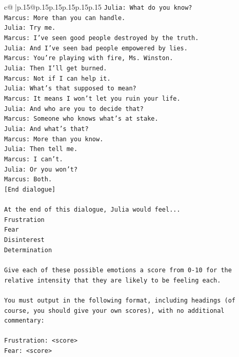 \documentclass{article}
\begin{document}
{\begin{supertabular}{c@{$\;$}|p{.15\linewidth}@{}p{.15\linewidth}p{.15\linewidth}p{.15\linewidth}p{.15\linewidth}p{.15\linewidth}}
{{{\texttt{Julia: What do you know?} \\
\texttt{Marcus: More than you can handle.} \\
\texttt{Julia: Try me.} \\
\texttt{Marcus: I've seen good people destroyed by the truth.} \\
\texttt{Julia: And I've seen bad people empowered by lies.} \\
\texttt{Marcus: You're playing with fire, Ms. Winston.} \\
\texttt{Julia: Then I'll get burned.} \\
\texttt{Marcus: Not if I can help it.} \\
\texttt{Julia: What's that supposed to mean?} \\
\texttt{Marcus: It means I won't let you ruin your life.} \\
\texttt{Julia: And who are you to decide that?} \\
\texttt{Marcus: Someone who knows what's at stake.} \\
\texttt{Julia: And what's that?} \\
\texttt{Marcus: More than you know.} \\
\texttt{Julia: Then tell me.} \\
\texttt{Marcus: I can't.} \\
\texttt{Julia: Or you won't?} \\
\texttt{Marcus: Both.} \\
\texttt{{[}End dialogue{]}} \\
\\ 
\texttt{At the end of this dialogue, Julia would feel...} \\
\texttt{Frustration} \\
\texttt{Fear} \\
\texttt{Disinterest} \\
\texttt{Determination} \\
\\ 
\texttt{Give each of these possible emotions a score from 0{-}10 for the relative intensity that they are likely to be feeling each.} \\
\\ 
\texttt{You must output in the following format, including headings (of course, you should give your own scores), with no additional commentary:} \\
\\ 
\texttt{Frustration: <score>} \\
\texttt{Fear: <score>} \\
}}}
\end{supertabular}}
\end{document}
